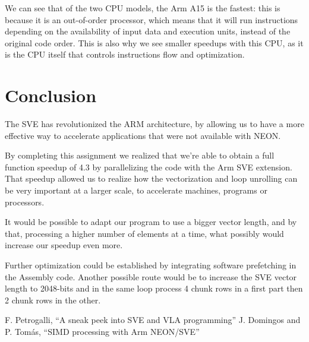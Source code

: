 \documentclass[conference]{IEEEtran}
\begin{document}
We can see that of the two CPU models, the Arm A15 is the fastest: this is because it is an out-of-order processor, which means that it will run instructions depending on the availability of input data and execution units, instead of the original code order. This is also why we see smaller speedups with this CPU, as it is the CPU itself that controls instructions flow and optimization. 



\section{Conclusion}

The SVE has revolutionized the ARM architecture, by allowing us to have a more effective way to accelerate applications that were not available with NEON.\par

By completing this assignment we realized that we're able to obtain a full function speedup of 4.3 by parallelizing the code with the Arm SVE extension. That speedup allowed us to realize how the vectorization and loop unrolling can be very important at a larger scale, to accelerate machines, programs or processors.\par

It would be possible to adapt our program to use a bigger vector length, and by that, processing a higher number of elements at a time, what possibly would increase our speedup even more.

Further optimization could be established by integrating software prefetching in the Assembly code. Another possible route would be to increase the SVE vector length to 2048-bits and in the same loop process 4 chunk rows in a first part then 2 chunk rows in the other.






\begin{thebibliography}{00}
 F. Petrogalli, ``A sneak peek into SVE and VLA programming''
 J. Domingos and P. Tomás, ``SIMD processing with Arm NEON/SVE''

\end{thebibliography}
\end{document}
